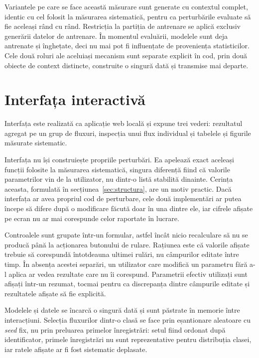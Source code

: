 Variantele pe care se face această măsurare sunt generate cu contextul complet, identic cu cel folosit la măsurarea sistematică, pentru ca perturbările evaluate să fie aceleași rând cu rând. Restricția la partiția de antrenare se aplică exclusiv generării datelor de antrenare. În momentul evaluării, modelele sunt deja antrenate și înghețate, deci nu mai pot fi influențate de proveniența statisticilor. Cele două roluri ale aceluiași mecanism sunt separate explicit în cod, prin două obiecte de context distincte, construite o singură dată și transmise mai departe.


\section{Interfața interactivă}\label{sec:implinterfata}

Interfața este realizată ca aplicație web locală și expune trei vederi: rezultatul agregat pe un grup de fluxuri, inspecția unui flux individual și tabelele și figurile măsurate sistematic.

Interfața nu își construiește propriile perturbări. Ea apelează exact aceleași funcții folosite la măsurarea sistematică, singura diferență fiind că valorile parametrilor vin de la utilizator, nu dintr-o listă stabilită dinainte. Cerința aceasta, formulată în secțiunea~\ref{sec:structura}, are un motiv practic. Dacă interfața ar avea propriul cod de perturbare, cele două implementări ar putea începe să difere după o modificare făcută doar în una dintre ele, iar cifrele afișate pe ecran nu ar mai corespunde celor raportate în lucrare.

Controalele sunt grupate într-un formular, astfel încât nicio recalculare să nu se producă până la acționarea butonului de rulare. Rațiunea este că valorile afișate trebuie să corespundă întotdeauna ultimei rulări, nu câmpurilor editate între timp. În absența acestei separări, un utilizator care modifică un parametru fără a-l aplica ar vedea rezultate care nu îi corespund. Parametrii efectiv utilizați sunt afișați într-un rezumat, tocmai pentru ca discrepanța dintre câmpurile editate și rezultatele afișate să fie explicită.

Modelele și datele se încarcă o singură dată și sunt păstrate în memorie între interacțiuni. Selecția fluxurilor dintr-o clasă se face prin eșantionare aleatoare cu \textit{seed} fix, nu prin preluarea primelor înregistrări: setul fiind ordonat după identificator, primele înregistrări nu sunt reprezentative pentru distribuția clasei, iar ratele afișate ar fi fost sistematic deplasate.

